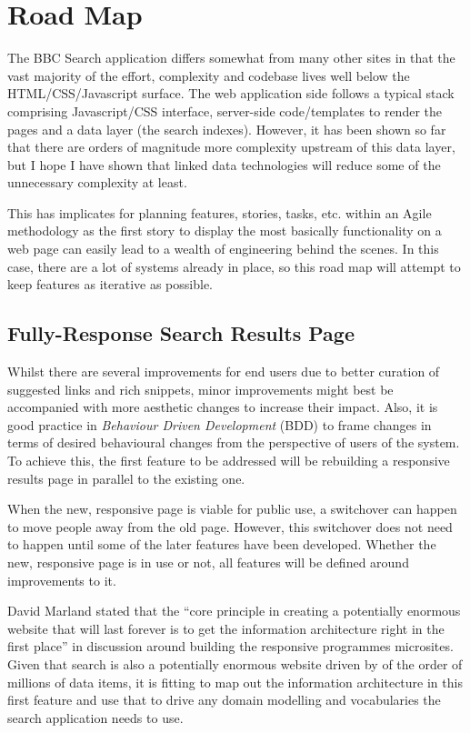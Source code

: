 \section{Road Map}

The BBC Search application differs somewhat from many other sites in that
the vast majority of the effort, complexity and codebase lives well
below the HTML/CSS/Javascript surface. The web application side follows
a typical stack comprising Javascript/CSS interface, server-side code/templates
to render the pages and a data layer (the search indexes). However, it has been
shown so far that there are orders of magnitude more complexity upstream
of this data layer, but I hope I have shown that linked data technologies
will reduce some of the unnecessary complexity at least.

This has implicates for planning features, stories, tasks, etc. within
an Agile methodology as the first story to display the most basically
functionality on a web page can easily lead to a wealth of engineering
behind the scenes. In this case, there are a lot of systems already in
place, so this road map will attempt to keep features as iterative as possible.

\subsection{Fully-Response Search Results Page}

Whilst there are several improvements for end users due to better
curation of suggested links and rich snippets, minor improvements
might best be accompanied with more aesthetic changes to increase
their impact. Also, it is good practice in \emph{Behaviour Driven Development}
(BDD) to frame changes in terms of desired behavioural changes from
the perspective of users of the system. To achieve this, the first
feature to be addressed will be rebuilding a responsive results
page in parallel to the existing one.

When the new, responsive page is viable for public use, a switchover
can happen to move people away from the old page. However, this
switchover does not need to happen until some of the later features
have been developed. Whether the new, responsive page is in
use or not, all features will be defined around improvements to
it.

David Marland stated that the ``core principle in creating a potentially
enormous website that will last forever is to get the information
architecture right in the first place'' in discussion around
building the responsive programmes microsites.\cite{marland2014responsive}
Given that
search is also a potentially enormous website driven by of the
order of millions of data items, it is fitting to map out the
information architecture in this first feature and use that to
drive any domain modelling and vocabularies the search application
needs to use.

